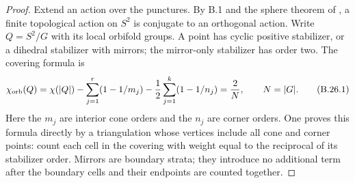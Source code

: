 \begin{proof}
Extend an action over the punctures.  By B.1 and the sphere theorem of
\cite[Theorem 1.2]{bKolev2006}, a finite topological action on $S^2$ is
conjugate to an orthogonal action.  Write $Q=S^2/G$ with its local
orbifold groups.  A point has cyclic positive stabilizer, or a dihedral
stabilizer with mirrors; the mirror-only stabilizer has order two.
The covering formula is
\[
 \chi_{\rm orb}(Q)=\chi(|Q|)
  -\sum_{j=1}^r(1-1/m_j)
  -\frac12\sum_{j=1}^k(1-1/n_j)=\frac2N,
 \qquad N=|G|.                                      \tag{B.26.1}
\]
Here the $m_j$ are interior cone orders and the $n_j$ are corner orders.
One proves this formula directly by a triangulation whose vertices
include all cone and corner points: count each cell in the covering
with weight equal to the reciprocal of its stabilizer order.  Mirrors
are boundary strata; they introduce no additional term after the
boundary cells and their endpoints are counted together.


\end{proof}
